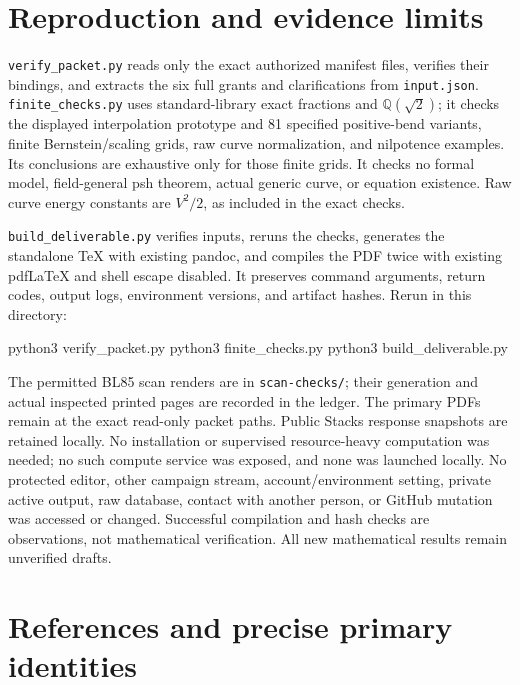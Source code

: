 \documentclass[
  11pt,
]{article}
\newenvironment{Shaded}{}{}
\newcommand{\ExtensionTok}[1]{#1}
\newcommand{\NormalTok}[1]{#1}
\begin{document}
\section{Reproduction and evidence
limits}\label{reproduction-and-evidence-limits}

\texttt{verify\_packet.py} reads only the exact authorized manifest
files, verifies their bindings, and extracts the six full grants and
clarifications from \texttt{input.json}. \texttt{finite\_checks.py} uses
standard-library exact fractions and \(\mathbb Q(\sqrt2)\); it checks
the displayed interpolation prototype and 81 specified positive-bend
variants, finite Bernstein/scaling grids, raw curve normalization, and
nilpotence examples. Its conclusions are exhaustive only for those
finite grids. It checks no formal model, field-general psh theorem,
actual generic curve, or equation existence. Raw curve energy constants
are \(V^2/2\), as included in the exact checks.

\texttt{build\_deliverable.py} verifies inputs, reruns the checks,
generates the standalone TeX with existing pandoc, and compiles the PDF
twice with existing pdfLaTeX and shell escape disabled. It preserves
command arguments, return codes, output logs, environment versions, and
artifact hashes. Rerun in this directory:

\begin{Shaded}
\begin{Highlighting}[]
\ExtensionTok{python3}\NormalTok{ verify\_packet.py}
\ExtensionTok{python3}\NormalTok{ finite\_checks.py}
\ExtensionTok{python3}\NormalTok{ build\_deliverable.py}
\end{Highlighting}
\end{Shaded}

The permitted BL85 scan renders are in \texttt{scan-checks/}; their
generation and actual inspected printed pages are recorded in the
ledger. The primary PDFs remain at the exact read-only packet paths.
Public Stacks response snapshots are retained locally. No installation
or supervised resource-heavy computation was needed; no such compute
service was exposed, and none was launched locally. No protected editor,
other campaign stream, account/environment setting, private active
output, raw database, contact with another person, or GitHub mutation
was accessed or changed. Successful compilation and hash checks are
observations, not mathematical verification. All new mathematical
results remain unverified drafts.

\section{References and precise primary
identities}\label{references-and-precise-primary-identities}
\end{document}
